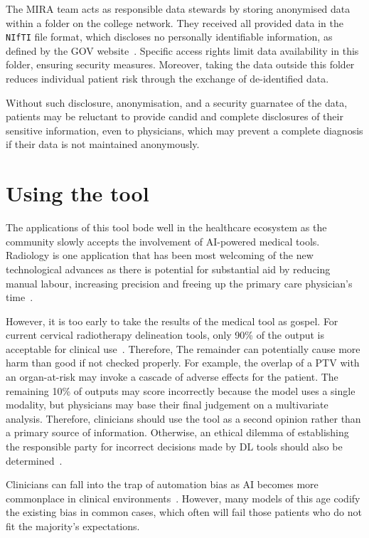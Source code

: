 \documentclass[12pt,twoside]{report}
\begin{document}
The MIRA team acts as responsible data stewards by storing anonymised data within a folder on the college network. They received all provided data in the \texttt{NIfTI} file format, which discloses no personally identifiable information, as defined by the GOV website~\cite{gov-gdpr}. Specific access rights limit data availability in this folder, ensuring security measures. Moreover, taking the data outside this folder reduces individual patient risk through the exchange of de-identified data.

Without such disclosure, anonymisation, and a security guarnatee of the data, patients may be reluctant to provide candid and complete disclosures of their sensitive information, even to physicians, which may prevent a complete diagnosis if their data is not maintained anonymously.

\section{Using the tool}\label{sect:using-the-tool}

The applications of this tool bode well in the healthcare ecosystem as the community slowly accepts the involvement of AI-powered medical tools. Radiology is one application that has been most welcoming of the new technological advances as there is potential for substantial aid by reducing manual labour, increasing precision and freeing up the primary care physician's time~\cite{Amisha2019-ki}.

However, it is too early to take the results of the medical tool as gospel. For current cervical radiotherapy delineation tools, only 90\% of the output is acceptable for clinical use~\cite{LIU2020172}. Therefore, The remainder can potentially cause more harm than good if not checked properly. For example, the overlap of a PTV with an organ-at-risk may invoke a cascade of adverse effects for the patient. The remaining 10\% of outputs may score incorrectly because the model uses a single modality, but physicians may base their final judgement on a multivariate analysis. Therefore, clinicians should use the tool as a second opinion rather than a primary source of information. Otherwise, an ethical dilemma of establishing the responsible party for incorrect decisions made by DL tools should also be determined~\cite{Chen2021-dg}.

Clinicians can fall into the trap of automation bias as AI becomes more commonplace in clinical environments~\cite{STRAW2020101965}. However, many models of this age codify the existing bias in common cases, which often will fail those patients who do not fit the majority's expectations. 
\end{document}
